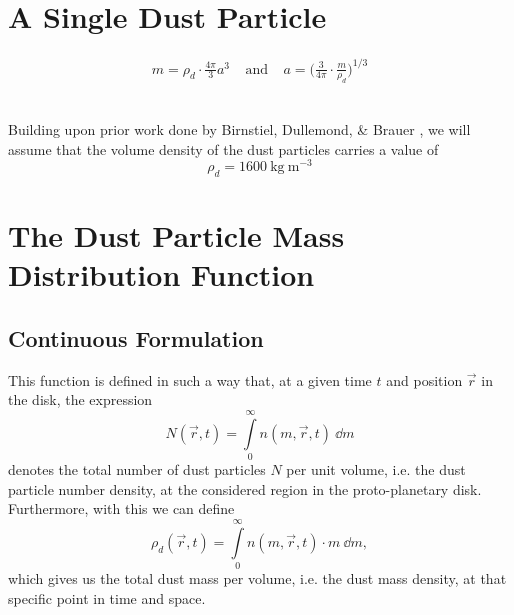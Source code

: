 \section{A Single Dust Particle}

    \begin{align}
        m
            =\rho_d\cdot\frac{4\pi}{3}a^3
        \ \ \ \ \ \text{and}\ \ \ \ \
        a
            =\bigg(\frac{3}{4\pi}\cdot\frac{m}{\rho_d}\bigg)^{1/3}
    \end{align}

     \\

    Building upon prior work done by Birnstiel, Dullemond, \& Brauer %
    \cite{birnstiel_dullemond_brauer_2010}, we will assume that the volume density of the dust 
    particles carries a value of
    $$\rho_d=\SI{1600}{\kilogram\ \meter^{-3}}$$

\section{The Dust Particle Mass Distribution Function}

    \subsection{Continuous Formulation}

        This function is defined in such a way that, at a given time $t$ and position $\vec r$ 
        in the disk, the expression
        \begin{equation}
            N(\vec r, t)
                =\int\limits_0^\infty n(m,\vec r, t)\ \dd m
        \end{equation}
        denotes the total number of dust particles $N$ per unit volume, i.e. the dust particle
        number density, at the considered region in the proto-planetary disk. \\

        Furthermore, with this we can define 
        \begin{equation}
            \rho_d(\vec r, t)
                =\int\limits_0^\infty n(m,\vec r, t)\cdot m\ \dd m,
        \end{equation}
        which gives us the total dust mass per volume, i.e. the dust mass density, 
        at that specific point in time and space.

